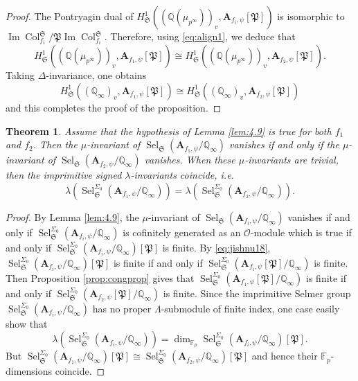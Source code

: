 \documentclass{amsart}
\newtheorem{theorem}{Theorem}[section]
\newcommand{\Q}{\mathbb{Q}}
\newcommand{\fS}{\mathfrak{S}}
\newcommand{\bA}{\mathbf{A}}
\newcommand{\col}{\operatorname{Col}}
\newcommand{\im}{\operatorname{Im}}
\newcommand{\Sel}{\operatorname{Sel}}
\renewcommand{\O}{\mathcal{O}}
\newtheorem{auxiliary proposition}[theorem]{Auxiliary Proposition}
\newtheorem{main conjecture}[theorem]{Main Conjecture}
\newtheorem{main theorem}[theorem]{Main Theorem}
\newtheorem{modesty proposition}[theorem]{Modesty Proposition}
\newtheorem{open problem}[theorem]{Open Problem}
\newtheorem{convergence lemma}[theorem]{Convergence Lemma}
\newtheorem{corrected lemma}[theorem]{Corrected Lemma}
\newtheorem{growth lemma}[theorem]{Growth Lemma}
\newtheorem{coefficient lemma}[theorem]{Integrality Lemma}
\newtheorem{interpolation lemma}[theorem]{Interpolation Lemma}
\newtheorem{kernel lemma}[theorem]{Kernel Lemma}
\newtheorem{limit lemma}[theorem]{Limit Lemma}
\newtheorem{tandem lemma}[theorem]{Modesty Lemma}
\newtheorem{zero-finding lemma}[theorem]{Zero-Finding Lemma}
\begin{document}
\begin{proof}
   
The Pontryagin dual of $H^1_{\fS}((\Q(\mu_{p^\infty}))_v,\bA_{f_i, \psi}[\mathfrak{P}])$ is isomorphic to $\im \col_{f_i}^{\fS}/\mathfrak{P}\im \col_{f_i}^{\fS}$. Therefore, using \eqref{eq:align1}, we deduce that 
$$H^1_{\fS}((\Q(\mu_{p^\infty}))_v,\bA_{f_1, \psi}[\mathfrak{P}]) \cong H^1_{\fS}((\Q(\mu_{p^\infty}))_v,\bA_{f_2, \psi}[\mathfrak{P}]). $$ 
Taking $\Delta$-invariance, one obtains $$H^1_{\fS}((\Q_\infty)_v,\bA_{f_1, \psi}[\mathfrak{P}])\cong H^1_{\fS}((\Q_\infty)_v,\bA_{f_2, \psi}[\mathfrak{P}])$$ and this completes the proof of the proposition.   
\end{proof}
\begin{theorem}\label{prop: lambda}
Assume that the hypothesis of Lemma \ref{lem:4.9} is true for both $f_1$ and $f_2$.  Then the $\mu$-invariant of $\Sel_{\fS}(\bA_{f_1, \psi}/\Q_\infty)$ vanishes if and only if the $\mu$-invariant of $\Sel_{\fS}(\bA_{f_2, \psi}/\Q_\infty)$ vanishes. When these $\mu$-invariants are trivial, then the imprimitive signed $\lambda$-invariants coincide, i.e. 
$$\lambda (\Sel^{\Sigma_0}_{\fS}(\bA_{f_1, \psi}/\Q_\infty))=\lambda (\Sel^{\Sigma_0}_{\fS}(\bA_{f_2, \psi}/\Q_\infty)).$$
\end{theorem}
\begin{proof}
    By Lemma \ref{lem:4.9}, the $\mu$-invariant of $\Sel_{\fS}(\bA_{f_i, \psi}/\Q_\infty)$ vanishes if and only if $\Sel_{\fS}^{\Sigma_0}(\bA_{f_i, \psi}/\Q_\infty)$ is cofinitely generated as an $\O$-module which is true if and only if $\Sel_{\fS}^{\Sigma_0}(\bA_{f_i, \psi}/\Q_\infty)[\mathfrak{P}]$ is finite. By \eqref{eq:jishnu18}, $\Sel_{\fS}^{\Sigma_0}(\bA_{f_i, \psi}/\Q_\infty)[\mathfrak{P}]$ is finite if and only if  $\Sel_{\fS}^{\Sigma_0}(\bA_{f_i, \psi}[\mathfrak{P}]/\Q_\infty)$ is finite.  Then Proposition \ref{prop:congprop} gives that $\Sel_{\fS}^{\Sigma_0}(\bA_{f_1, \psi}[\mathfrak{P}]/\Q_\infty)$ is finite if and only if $\Sel_{\fS}^{\Sigma_0}(\bA_{f_2, \psi}[\mathfrak{P}]/\Q_\infty)$ is finite. 
\vspace{.2cm}
Since the imprimitive Selmer group $\Sel^{\Sigma_0}_{\fS}(\bA_{f_i, \psi}/\Q_\infty)$ has no proper $\Lambda$-submodule of finite index, one case easily show that $$\lambda(\Sel^{\Sigma_0}_{\fS}(\bA_{f_i, \psi}/\Q_\infty))=\dim_{\mathbb{F}_p}\Sel_{\fS}^{\Sigma_0}(\bA_{f_i, \psi}/\Q_\infty)[\mathfrak{P}].$$ But $\Sel_{\fS}^{\Sigma_0}(\bA_{f_1, \psi}/\Q_\infty)[\mathfrak{P}]\cong \Sel_{\fS}^{\Sigma_0}(\bA_{f_2, \psi}/\Q_\infty)[\mathfrak{P}]$ and hence their $\mathbb{F}_p$-dimensions coincide. 
\end{proof}
\end{document}
